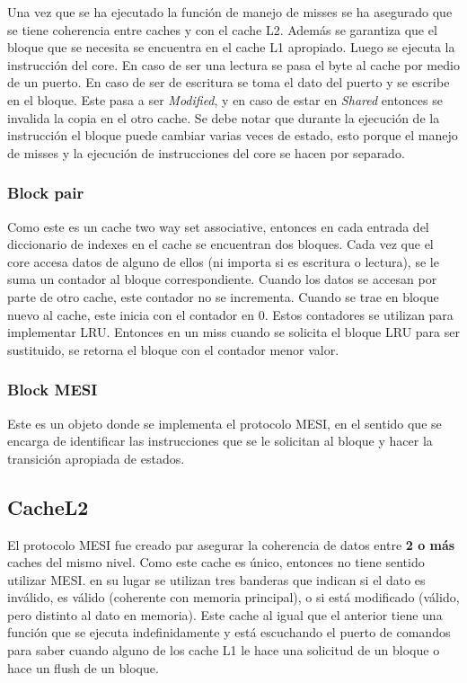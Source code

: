 \documentclass {article}
\begin{document}
Una vez que se ha ejecutado la función de manejo de misses se ha asegurado que se tiene coherencia
entre caches y con el cache L2. Además se garantiza que el bloque que se necesita se encuentra en el
cache L1 apropiado. Luego se ejecuta la instrucción del core. En caso de ser una lectura se pasa el
byte al cache por medio de un puerto. En caso de ser de escritura se toma el dato del puerto y se
escribe en el bloque. Este pasa a ser \textit{Modified}, y en caso de estar en \textit{Shared} entonces se invalida
la copia en el otro cache. Se debe notar que durante la ejecución de la instrucción el bloque puede
cambiar varias veces de estado, esto porque el manejo de misses y la ejecución de instrucciones del
core se hacen por separado.

\subsubsection{Block pair}

Como este es un cache two way set associative, entonces en cada entrada del diccionario de indexes en
el cache se encuentran dos bloques. Cada vez que el core accesa datos de alguno de ellos (ni importa
si es escritura o lectura), se le suma un contador al bloque correspondiente. Cuando los datos se
accesan por parte de otro cache, este contador no se incrementa. Cuando se trae en bloque nuevo al
cache, este inicia con el contador en 0. Estos contadores se utilizan para implementar LRU. Entonces
en un miss cuando se solicita el bloque LRU para ser sustituido, se retorna el bloque con el
contador menor valor.

\subsubsection{Block MESI}

Este es un objeto donde se implementa el protocolo MESI, en el sentido que se encarga de identificar
las instrucciones que se le solicitan al bloque y hacer la transición apropiada de estados.
%
%

\subsection{CacheL2}

El protocolo MESI fue creado par asegurar la coherencia de datos entre \textbf{2 o más} caches del
mismo nivel. Como este cache es único, entonces no tiene sentido utilizar MESI. en su lugar se
utilizan tres banderas que indican si el dato es inválido, es válido (coherente con memoria
principal), o si está modificado (válido, pero distinto al dato en memoria). Este cache al igual que
el anterior tiene una función que se ejecuta indefinidamente y está escuchando el puerto de comandos
para saber cuando alguno de los cache L1 le hace una solicitud de un bloque o hace un flush de un
bloque.
\end{document}
